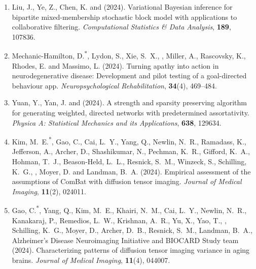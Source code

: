 \begin{enumerate}[resume=journalpubs]

\item\begin{pubentry} Liu, J., Ye, Z., Chen, K. and \PZ{} (2024). Variational Bayesian inference for bipartite mixed-membership stochastic block model with applications to collaborative filtering. \emph{Computational Statistics \& Data Analysis}, \textbf{189}, 107836.

\par\end{pubentry}
\item\begin{pubentry} Mechanic-Hamilton, D.\textsuperscript{*}, Lydon, S., Xie, S.\ X., \PZnot{}, Miller, A., Rascovsky, K., Rhodes, E. and Massimo, L. (2024). Turning apathy into action in neurodegenerative disease: Development and pilot testing of a goal-directed behaviour app. \emph{Neuropsychological Rehabilitation}, \textbf{34}(4), 469--484.

\par\end{pubentry}
\item\begin{pubentry} Yuan, Y., Yan, J. and \PZ{} (2024). A strength and sparsity preserving algorithm for generating weighted, directed networks with predetermined assortativity. \emph{Physica A: Statistical Mechanics and its Applications}, \textbf{638}, 129634.

\par\end{pubentry}
\item\begin{pubentry} Kim, M.\ E.\textsuperscript{*}, Gao, C., Cai, L.\ Y., Yang, Q., Newlin, N.\ R., Ramadass, K., Jefferson, A., Archer, D., Shashikumar, N., Pechman, K.\ R., Gifford, K.\ A., Hohman, T.\ J., Beason-Held, L.\ L., Resnick, S.\ M., Winzeck, S., Schilling, K.\ G., \PZnot{}, Moyer, D. and Landman, B.\ A. (2024). Empirical assessment of the assumptions of ComBat with diffusion tensor imaging. \emph{Journal of Medical Imaging}, \textbf{11}(2), 024011.

\par\end{pubentry}
\item\begin{pubentry} Gao, C.\textsuperscript{*}, Yang, Q., Kim, M.\ E., Khairi, N.\ M., Cai, L.\ Y., Newlin, N.\ R., Kanakaraj, P., Remedios, L.\ W., Krishnan, A.\ R., Yu, X., Yao, T., \PZnot{}, Schilling, K.\ G., Moyer, D., Archer, D.\ B., Resnick, S.\ M., Landman, B.\ A., Alzheimer's Disease Neuroimaging Initiative and BIOCARD Study team (2024). Characterizing patterns of diffusion tensor imaging variance in aging brains. \emph{Journal of Medical Imaging}, \textbf{11}(4), 044007.


\end{pubentry}
\end{enumerate}
